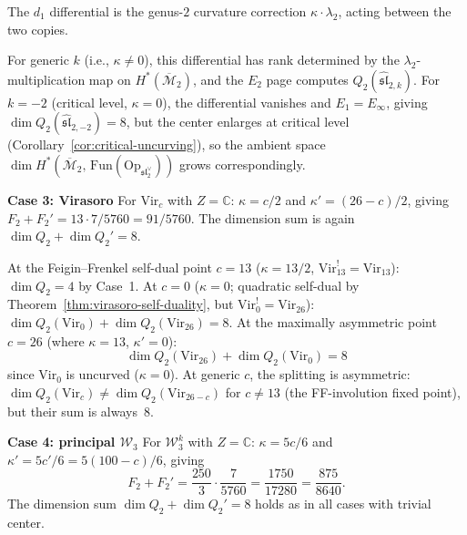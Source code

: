\begin{computation}
The $d_1$ differential is the genus-$2$ curvature correction
$\kappa \cdot \lambda_2$, acting between the two copies.

For generic $k$ (i.e., $\kappa \neq 0$), this differential
has rank determined by the $\lambda_2$-multiplication map on
$H^*(\overline{\mathcal{M}}_2)$, and the $E_2$ page computes
$Q_2(\widehat{\mathfrak{sl}}_{2,k})$. For $k = -2$ (critical level,
$\kappa = 0$), the differential vanishes and $E_1 = E_\infty$, giving
$\dim Q_2(\widehat{\mathfrak{sl}}_{2,-2}) = 8$, but the center
enlarges at critical level
(Corollary~\ref{cor:critical-uncurving}), so the ambient space
$\dim H^*(\overline{\mathcal{M}}_2,\,
\mathrm{Fun}(\mathrm{Op}_{\mathfrak{sl}_2^\vee}))$
grows correspondingly.

\smallskip
\noindent\textbf{Case 3: Virasoro} For $\mathrm{Vir}_c$ with $Z = \mathbb{C}$:
$\kappa = c/2$ and $\kappa' = (26-c)/2$, giving
$F_2 + F_2' = 13 \cdot 7/5760 = 91/5760$.
The dimension sum is again $\dim Q_2 + \dim Q_2' = 8$.

At the Feigin--Frenkel self-dual point $c = 13$ ($\kappa = 13/2$,
$\mathrm{Vir}_{13}^! = \mathrm{Vir}_{13}$):
$\dim Q_2 = 4$ by Case~1.
At $c = 0$ ($\kappa = 0$; quadratic self-dual by
Theorem~\ref{thm:virasoro-self-duality}, but $\mathrm{Vir}_0^!
= \mathrm{Vir}_{26}$): $\dim Q_2(\mathrm{Vir}_0) + \dim
Q_2(\mathrm{Vir}_{26}) = 8$.
At the maximally asymmetric point
$c = 26$ (where $\kappa = 13$, $\kappa' = 0$):
\[
\dim Q_2(\mathrm{Vir}_{26}) + \dim Q_2(\mathrm{Vir}_0) = 8
\]
since $\mathrm{Vir}_0$ is uncurved ($\kappa = 0$).
At generic $c$, the splitting is asymmetric:
$\dim Q_2(\mathrm{Vir}_c) \neq \dim Q_2(\mathrm{Vir}_{26-c})$
for $c \neq 13$ (the FF-involution fixed point), but
their sum is always~$8$.

\smallskip
\noindent\textbf{Case 4: principal $\mathcal{W}_3$} For $\mathcal{W}_3^k$ with $Z = \mathbb{C}$:
$\kappa = 5c/6$ and $\kappa' = 5c'/6 = 5(100-c)/6$, giving
\[
F_2 + F_2' = \frac{250}{3} \cdot \frac{7}{5760}
= \frac{1750}{17280} = \frac{875}{8640}.
\]
The dimension sum $\dim Q_2 + \dim Q_2' = 8$ holds as in all
cases with trivial center.
\end{computation}

